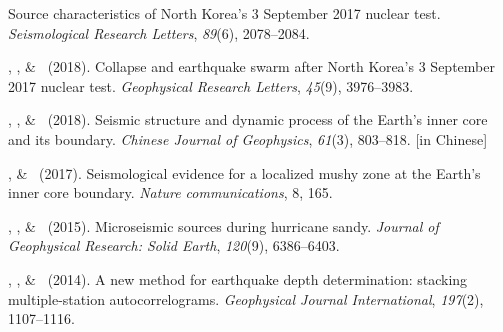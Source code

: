 \begin{etaremune}
	Source characteristics of North Korea's 3 September 2017 nuclear test.
    \emph{Seismological Research Letters}, \emph{89}(6), 2078--2084.
\item
    \Tian\CS, \JYao, \& \LWen\ (2018).
    Collapse and earthquake swarm after North Korea's 3 September 2017 nuclear test.
    \emph{Geophysical Research Letters}, \emph{45}(9), 3976--3983.
\item
    \LWen, \Tian, \& \JYao\ (2018).
    Seismic structure and dynamic process of the Earth's inner core and its boundary.
    \emph{Chinese Journal of Geophysics}, \emph{61}(3), 803--818.
     [in Chinese]
\item
    \Tian, \& \LWen\ (2017).
    Seismological evidence for a localized mushy zone at the Earth's inner core boundary.
    \emph{Nature communications}, 8, 165.
\item
    \XChen, \Tian, \& \LWen\ (2015).
    Microseismic sources during hurricane sandy.
    \emph{Journal of Geophysical Research: Solid Earth}, \emph{120}(9), 6386--6403.
\item \MZhang, \Tian, \& \LWen\ (2014).
    A new method for earthquake depth determination: stacking multiple-station autocorrelograms.
    \emph{Geophysical Journal International}, \emph{197}(2), 1107--1116.
\end{etaremune}



